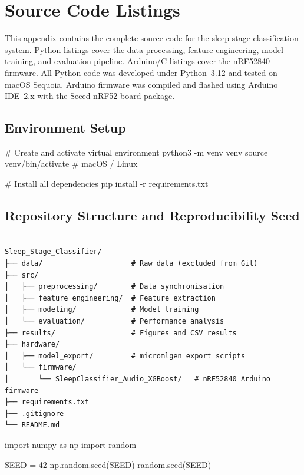\appendix
\chapter{Source Code Listings}
\label{app:source_code}

This appendix contains the complete source code for the sleep stage classification
system. Python listings cover the data processing, feature engineering, model
training, and evaluation pipeline. Arduino/C listings cover the nRF52840 firmware.
All Python code was developed under Python~3.12 and tested on macOS Sequoia.
Arduino firmware was compiled and flashed using Arduino IDE~2.x with the Seeed
nRF52 board package.

\section{Environment Setup}
\label{app:env_setup}

\begin{bashcode}
# Create and activate virtual environment
python3 -m venv venv
source venv/bin/activate        # macOS / Linux

# Install all dependencies
pip install -r requirements.txt
\end{bashcode}

\newpage
\section{Repository Structure and Reproducibility Seed}
\label{app:repo_structure}

\begin{verbatim}

Sleep_Stage_Classifier/
├── data/                     # Raw data (excluded from Git)
├── src/
│   ├── preprocessing/        # Data synchronisation
│   ├── feature_engineering/  # Feature extraction
│   ├── modeling/             # Model training
│   └── evaluation/           # Performance analysis
├── results/                  # Figures and CSV results
├── hardware/
│   ├── model_export/         # micromlgen export scripts
│   └── firmware/
│       └── SleepClassifier_Audio_XGBoost/   # nRF52840 Arduino firmware
├── requirements.txt
├── .gitignore
└── README.md

\end{verbatim}

\begin{pycode}
import numpy as np
import random

SEED = 42
np.random.seed(SEED)
random.seed(SEED)
\end{pycode}

